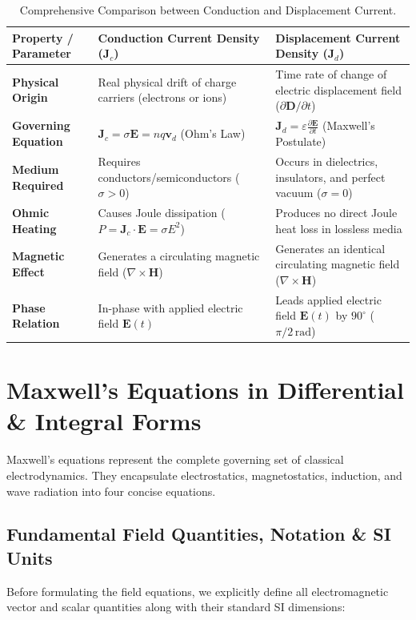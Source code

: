 \begin{table}[htbp]
\centering
\small
\renewcommand{\arraystretch}{1.3}
\begin{tabularx}{\linewidth}{lXX}
\toprule
\textbf{Property / Parameter} & \textbf{Conduction Current Density ($\mathbf{J}_c$)} & \textbf{Displacement Current Density ($\mathbf{J}_d$)} \\
\midrule
\textbf{Physical Origin} & Real physical drift of charge carriers (electrons or ions) & Time rate of change of electric displacement field ($\partial \mathbf{D}/\partial t$) \\
\textbf{Governing Equation} & $\mathbf{J}_c = \sigma \mathbf{E} = n q \mathbf{v}_d$ (Ohm's Law) & $\mathbf{J}_d = \varepsilon \frac{\partial \mathbf{E}}{\partial t}$ (Maxwell's Postulate) \\
\textbf{Medium Required} & Requires conductors/semiconductors ($\sigma > 0$) & Occurs in dielectrics, insulators, and perfect vacuum ($\sigma = 0$) \\
\textbf{Ohmic Heating} & Causes Joule dissipation ($P = \mathbf{J}_c \cdot \mathbf{E} = \sigma E^2$) & Produces no direct Joule heat loss in lossless media \\
\textbf{Magnetic Effect} & Generates a circulating magnetic field ($\nabla \times \mathbf{H}$) & Generates an identical circulating magnetic field ($\nabla \times \mathbf{H}$) \\
\textbf{Phase Relation} & In-phase with applied electric field $\mathbf{E}(t)$ & Leads applied electric field $\mathbf{E}(t)$ by $90^\circ$ ($\pi/2\,\text{rad}$) \\
\bottomrule
\end{tabularx}
\caption{Comprehensive Comparison between Conduction and Displacement Current.}
\label{tab:conduction-vs-displacement}
\end{table}

\section{Maxwell's Equations in Differential \& Integral Forms}

Maxwell's equations represent the complete governing set of classical electrodynamics. They encapsulate electrostatics, magnetostatics, induction, and wave radiation into four concise equations.

\subsection{Fundamental Field Quantities, Notation \& SI Units}
Before formulating the field equations, we explicitly define all electromagnetic vector and scalar quantities along with their standard SI dimensions:

